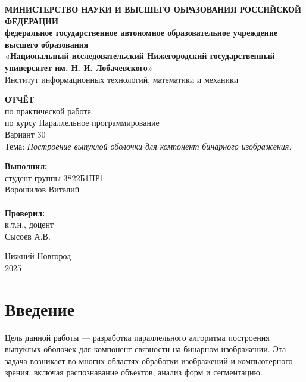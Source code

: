 \documentclass[12pt]{article}
\begin{document}
\begin{titlepage}
    \begin{center}
        \textbf{МИНИСТЕРСТВО НАУКИ И ВЫСШЕГО ОБРАЗОВАНИЯ РОССИЙСКОЙ ФЕДЕРАЦИИ}\\
        \textbf{федеральное государственное автономное образовательное учреждение высшего образования}\\
        \textbf{«Национальный исследовательский Нижегородский государственный университет им. Н. И. Лобачевского»}\\
        \vspace{0.5cm}
        Институт информационных технологий, математики и механики \\
        \vfill

        {\Large \textbf{ОТЧЁТ}}\\
        \vspace{0.5cm}
        по практической работе \\ 
        по курсу Параллельное программирование \\
        Вариант 30\\
        Тема: \textit{Построение выпуклой оболочки для компонент бинарного изображения.}
        \vfill

        \hfill\begin{minipage}{0.3\textwidth}
        \textbf{Выполнил:}\\
        студент группы 3822Б1ПР1\\
        Ворошилов Виталий\\
        \\
        \textbf{Проверил:}\\
        к.т.н., доцент\\
        Сысоев А.В.
        \end{minipage}

        \vfill
        Нижний Новгород\\
        2025
    \end{center}
\end{titlepage}

\tableofcontents
\newpage

\section{Введение}

Цель данной работы — разработка параллельного алгоритма построения выпуклых оболочек для компонент связности на бинарном изображении. Эта задача возникает во многих областях обработки изображений и компьютерного зрения, включая распознавание объектов, анализ форм и сегментацию.
\end{document}
